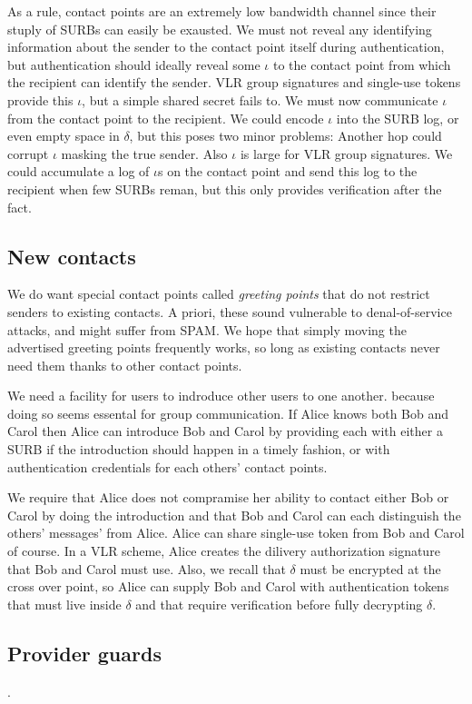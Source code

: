 As a rule, contact points are an extremely low bandwidth channel
since their stuply of SURBs can easily be exausted.  We must not
reveal any identifying information about the sender to the contact 
point itself during authentication, but authentication should ideally
reveal some $\iota$ to the contact point from which the recipient
can identify the sender.  VLR group signatures and single-use tokens
provide this $\iota$, but a simple shared secret fails to.  We must
now communicate $\iota$ from the contact point to the recipient. 
We could encode $\iota$ into the SURB log, or even empty space in
$\delta$, but this poses two minor problems: 
 Another hop could corrupt $\iota$ masking the true sender.
 Also $\iota$ is large for VLR group signatures.  
We could accumulate a log of $\iota$s on the contact point and send
this log to the recipient when few SURBs reman, but this only
provides verification after the fact.



\subsection{New contacts}

We do want special contact points called {\em greeting points} that
do not restrict senders to existing contacts.  A priori, these sound
vulnerable to denal-of-service attacks, and might suffer from SPAM.
We hope that simply moving the advertised greeting points frequently
works, so long as existing contacts never need them thanks to other
contact points.

We need a facility for users to indroduce other users to one another.
because doing so seems essental for group communication.  If Alice 
knows both Bob and Carol then Alice can introduce Bob and Carol by
providing each with either a SURB if the introduction should happen
in a timely fashion, or with authentication credentials for each
others' contact points.  

We require that Alice does not compramise her ability to contact
either Bob or Carol by doing the introduction and that Bob and Carol
can each distinguish the others' messages' from Alice. 
Alice can share single-use token from Bob and Carol of course.
In a VLR scheme, Alice creates the dilivery authorization signature
that Bob and Carol must use.
Also, we recall that $\delta$ must be encrypted at the cross over
point, so Alice can supply Bob and Carol with authentication tokens 
that must live inside $\delta$ and that require verification before
fully decrypting $\delta$.  



\subsection{Provider guards}

.



